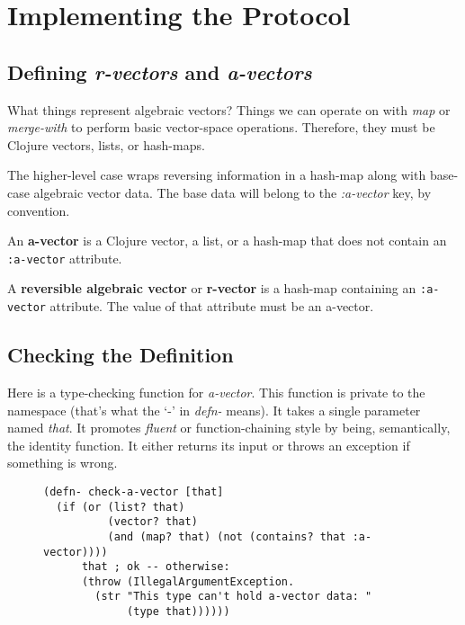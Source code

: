 \documentclass[11pt]{article}
\begin{document}
\section{Implementing the Protocol}
\label{sec-4}

\subsection{Defining \emph{r-vectors} and \emph{a-vectors}}
\label{sec-4-1}

What things represent algebraic vectors?  Things we can operate on
with \emph{map} or \emph{merge-with} to perform basic vector-space operations.
Therefore, they must be Clojure vectors, lists, or hash-maps.

The higher-level case wraps reversing information in a hash-map along
with base-case algebraic vector data. The base data will belong to
the \emph{\mbox{:a-vector}} key, by convention.


\begin{mydefinition}
   An \textbf{a-vector} is a Clojure vector, a list, or a hash-map that does not
   contain an \mbox{\texttt{:a-vector}} attribute.
\end{mydefinition}

\begin{mydefinition}
   A \textbf{reversible algebraic vector} or \textbf{r-vector} is a
   hash-map containing an \texttt{:a-vector} attribute. The value of
   that attribute must be an a-vector.
\end{mydefinition}
\subsection{Checking the Definition}
\label{sec-4-2}

Here is a type-checking function for \emph{a-vector}. This function is
private to the namespace (that's what the `-' in \emph{defn-} means).  It
takes a single parameter named \emph{that}. It promotes \emph{fluent} or
function-chaining style by being, semantically, the identity
function. It either returns its input or throws an exception if
something is wrong.

\begin{figure}[H]
\label{check-a-vector}
\begin{verbatim}
(defn- check-a-vector [that]
  (if (or (list? that)
          (vector? that)
          (and (map? that) (not (contains? that :a-vector))))
      that ; ok -- otherwise:
      (throw (IllegalArgumentException.
        (str "This type can't hold a-vector data: "
             (type that))))))
\end{verbatim}
\end{figure}
\end{document}
